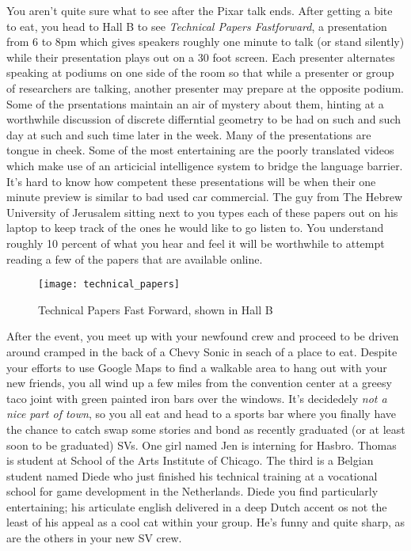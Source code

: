 \documentclass[../main.tex]{subfiles}
\begin{document}
You aren't quite sure what to see after the Pixar talk ends. After getting a bite to eat, you head to Hall B to see \textit{Technical Papers Fastforward}, a presentation from 6 to 8pm which gives speakers roughly one minute to talk (or stand silently) while their presentation plays out on a 30 foot screen. Each presenter alternates speaking at podiums on one side of the room so that while a presenter or group of researchers are talking, another presenter may prepare at the opposite podium. Some of the prsentations maintain an air of mystery about them, hinting at a worthwhile discussion of discrete differntial geometry to be had on such and such day at such and such time later in the week. Many of the presentations are tongue in cheek. Some of the most entertaining are the poorly translated videos which make use of an articicial intelligence system to bridge the language barrier. It's hard to know how competent these presentations will be when their one minute preview is similar to bad used car commercial. The guy from The Hebrew University of Jerusalem sitting next to you types each of these papers out on his laptop to keep track of the ones he would like to go listen to. You understand roughly 10 percent of what you hear and feel it will be worthwhile to attempt reading a few of the papers that are available online.

\begin{figure}[h!]
	\centering
	\texttt{[image: technical\_papers]}
	\caption*{Technical Papers Fast Forward, shown in Hall B}
\end{figure}

After the event, you meet up with your newfound crew and proceed to be driven around cramped in the back of a Chevy Sonic in seach of a place to eat. Despite your efforts to use Google Maps to find a walkable area to hang out with your new friends, you all wind up a few miles from the convention center at a greesy taco joint with green painted iron bars over the windows. It's decidedely \textit{not a nice part of town}, so you all eat and head to a sports bar where you finally have the chance to catch swap some stories and bond as recently graduated (or at least soon to be graduated) SVs. One girl named Jen is interning for Hasbro. Thomas is student at School of the Arts Institute of Chicago. The third is a Belgian student named Diede who just finished his technical training at a vocational school for game development in the Netherlands. Diede you find particularly entertaining; his articulate english delivered in a deep Dutch accent os not the least of his appeal as a cool cat within your group. He's funny and quite sharp, as are the others in your new SV crew. 
\end{document}
